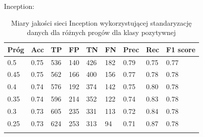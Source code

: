 \documentclass[polish,12pt]{aghthesis}
\begin{document}
\newpage
\par\noindent Inception:
 \begin{longtable}[h!]{|m{2.0cm}|m{1.2cm}|m{1.2cm}|m{1.2cm}|m{1.2cm}|m{1.2cm}|m{1.2cm}|m{1.2cm}|m{1.6cm}|}
 \hline
 Próg & Acc & TP & FP & TN & FN & Prec & Rec & F1 score\\
 \hline
 0.5 & 0.75 & 536 & 140 & 426 & 182 & 0.79 & 0.75 & 0.77\\
 \hline
 0.45 & 0.75 & 562 & 166 & 400 & 156 & 0.77 & 0.78 & 0.78\\
 \hline
 0.4 & 0.74 & 576 & 192 & 374 & 142 & 0.75 & 0.80 & 0.78\\
 \hline
 0.35 & 0.74 & 596 & 214 & 352 & 122 & 0.74 & 0.83 & 0.78\\
 \hline
 0.3 & 0.73 & 605 & 235 & 331 & 113 & 0.72 & 0.84 & 0.78\\
 \hline
 0.25 & 0.73 & 624 & 253 & 313 & 94 & 0.71 & 0.87 & 0.78\\
 \hline
\caption{Miary jakości sieci Inception wykorzystującej standaryzację danych dla różnych progów dla klasy pozytywnej}
\label{table:44}
\end{longtable}
\end{document}

